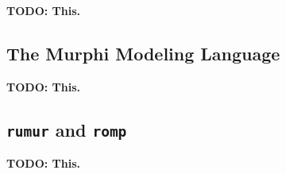 
\textbf{TODO: This.}

\subsection{The Murphi Modeling Language}\label{subsec:the-murphi-modeling-language}

\textbf{TODO: This.}

\subsection{\texttt{rumur} and \texttt{romp}}\label{subsec:rumur-and-romp}

\textbf{TODO: This.}
